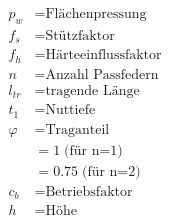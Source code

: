    \begin{scriptsize}
    \begin{minipage}{0.5\linewidth}
        \begin{center}
           \begin{align*}
               p_w &= \text{Flächenpressung}
               \\f_s &= \text{Stützfaktor}
               \\f_h &= \text{Härteeinflussfaktor}
               \\n &= \text{Anzahl Passfedern}
               \\l_{tr}&= \text{tragende Länge}
               \\t_1 &= \text{Nuttiefe}
               \\\varphi &= \text{Traganteil} 
               \\ &= 1 \; \text{(für n=1)}
               \\ &= 0.75 \; \text{(für n=2)}
               \\c_b &= \text{Betriebsfaktor}
               \\h &= \text{Höhe}
            \end{align*}
        \end{center}
   \end{minipage}
   \end{scriptsize}
   \begin{footnotesize}
   \end{footnotesize}
